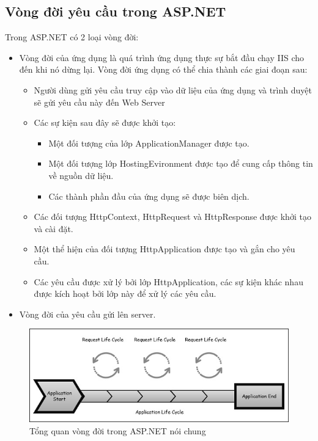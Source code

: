 \subsection{Vòng đời yêu cầu trong ASP.NET}
Trong ASP.NET có 2 loại vòng đời:
\begin{itemize}
	\item Vòng đời của ứng dụng là quá trình ứng dụng thực sự bắt đầu chạy IIS cho đến khi nó dừng lại. Vòng đời ứng dụng có thể chia thành các giai đoạn sau:
	\begin{itemize}
		\item Người dùng gửi yêu cầu truy cập vào dữ liệu của ứng dụng và trình duyệt sẽ gửi yêu cầu này đến Web Server
		\item Các sự kiện sau đây sẽ được khởi tạo:
		\begin{itemize}
			\item Một đối tượng của lớp ApplicationManager được tạo.
			\item Một đối tượng lớp HostingEvironment được tạo để cung cấp thông tin về nguồn dữ liệu.
			\item Các thành phần đầu của ứng dụng sẽ được biên dịch.
		\end{itemize}
		\item Các đối tượng HttpContext, HttpRequest và HttpResponse được khởi tạo và cài đặt.
		\item Một thể hiện của đối tượng HttpApplication được tạo và gắn cho yêu cầu.
		\item Các yêu cầu được xử lý bởi lớp HttpApplication, các sự kiện khác nhau được kích hoạt bởi lớp này để xử lý các yêu cầu.
	\end{itemize}
	\item Vòng đời của yêu cầu gửi lên server.
\end{itemize}
\begin{center}
    \begin{figure}[h]
    \begin{center}
     \includegraphics[scale=1.0]{image/vongdoiMVC.png}
    \end{center}
    \caption{Tổng quan vòng đời trong ASP.NET nói chung}
    \label{refhinh2_4}
    \end{figure}
\end{center}
